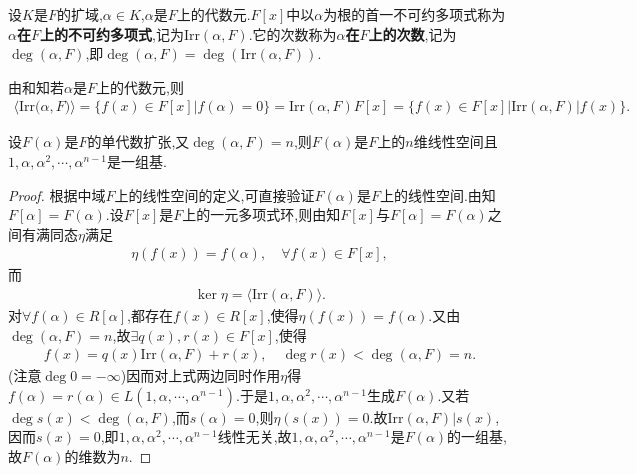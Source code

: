 \documentclass[../../main.tex]{subfiles}%
\begin{document}
\begin{definition}
设$K$是$F$的扩域,$\alpha\in K$,$\alpha$是$F$上的代数元.$F[x]$中以$\alpha$为根的首一不可约多项式称为\textbf{$\alpha$在$F$上的不可约多项式},记为$\mathrm{Irr}(\alpha,F)$.它的次数称为\textbf{$\alpha$在$F$上的次数},记为$\deg(\alpha,F)$,即$\deg(\alpha,F)=\deg(\mathrm{Irr}(\alpha,F))$.
\end{definition}
\begin{remark}
由和知若$\alpha$是$F$上的代数元,则
\begin{align*}
\langle \mathrm{Irr(}\alpha ,F)\rangle =\{f(x)\in F[x]|f(\alpha )=0\}
=\mathrm{Irr}(\alpha ,F)F[x]=\{f(x)\in F[x]|\mathrm{Irr}(\alpha ,F)|f(x)\}.
\end{align*}
\end{remark}

\begin{theorem}\label{theorem:抽象代数--定理3.1.4}
设$F(\alpha)$是$F$的单代数扩张,又$\deg(\alpha,F)=n$,则$F(\alpha)$是$F$上的$n$维线性空间且$1,\alpha,\alpha^2,\cdots,\alpha^{n-1}$是一组基.
\end{theorem}
\begin{proof}

根据中域$F$上的线性空间的定义,可直接验证$F(\alpha)$是$F$上的线性空间.由知$F[\alpha]=F(\alpha)$.设$F[x]$是$F$上的一元多项式环,则由知$F[x]$与$F[\alpha]=F(\alpha)$之间有满同态$\eta$满足
\begin{align*}
\eta(f(x))=f(\alpha),\quad \forall f(x)\in F[x],
\end{align*}
而
\begin{align*}
\ker\eta=\langle\mathrm{Irr}(\alpha,F)\rangle.
\end{align*}
对$\forall f(\alpha)\in R[\alpha]$,都存在$f(x)\in R[x]$,使得$\eta(f(x))=f(\alpha)$.又由$\deg(\alpha,F)=n$,故$\exists q(x),r(x)\in F[x]$,使得
\begin{align*}
f(x)=q(x)\mathrm{Irr}(\alpha,F)+r(x),\quad \deg r(x)<\deg(\alpha,F)=n.
\end{align*}
(注意$\deg0=-\infty$)因而对上式两边同时作用$\eta$得$f(\alpha)=r(\alpha)\in L(1,\alpha,\cdots,\alpha^{n-1})$.于是$1,\alpha,\alpha^2,\cdots,\alpha^{n-1}$生成$F(\alpha)$.又若$\deg s(x)<\deg(\alpha,F)$,而$s(\alpha)=0$,则$\eta(s(x))=0$.故$\mathrm{Irr}(\alpha,F)|s(x)$,因而$s(x)=0$,即$1,\alpha,\alpha^2,\cdots,\alpha^{n-1}$线性无关,故$1,\alpha,\alpha^2,\cdots,\alpha^{n-1}$是$F(\alpha)$的一组基,故$F(\alpha)$的维数为$n$.

\end{proof}
\end{document}
